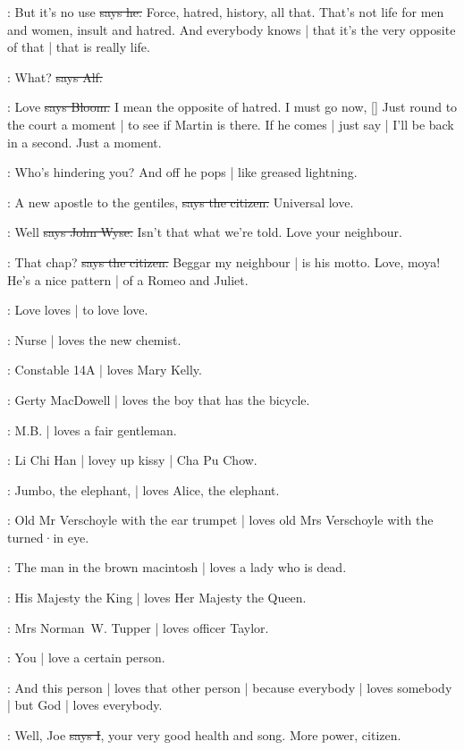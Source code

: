 \Bloom:
But it's no use
\sout{says he.}
Force,
hatred,
history,
all that.
That's not life for men and women,
insult and hatred.
And everybody knows |
that it's the very opposite of that |
that is really life.

\bergan:
What?
\sout{says Alf.}

\Bloom:
Love
\sout{says Bloom.}
I mean the opposite of hatred.
I must go now,
[]
Just round to the court a moment |
to see if Martin is there.
If he comes |
just say |
I'll be back in a second.
Just a moment.

\Nq:
Who's hindering you?
And off he pops |
like greased lightning.


\citizen:
A new apostle to the gentiles,
\sout{says the citizen.}
Universal love.

\johnwyse:
Well
\sout{says John Wyse.}
Isn't that what we're told.
Love your neighbour.

\citizen:
That chap?
\sout{says the citizen.}
Beggar my neighbour |
is his motto.
Love,
moya!
He's a nice pattern |
of a Romeo and Juliet.

:
Love loves |
to love love.

:
Nurse |
loves the new chemist.

:
Constable 14A |
loves Mary Kelly.

:
Gerty MacDowell |
loves the boy that has the bicycle.

:
M.B. |
loves a fair gentleman.

:
Li Chi Han |
lovey up kissy |
Cha Pu Chow.

:
Jumbo, the elephant, |
loves Alice, the elephant.

:
Old Mr Verschoyle with the ear trumpet |
loves old Mrs Verschoyle with the turned·in eye.

:
The man in the brown macintosh |
loves a lady who is dead.

:
His Majesty the King |
loves Her Majesty the Queen.

:
Mrs Norman~W. Tupper |
loves officer Taylor.

:
You |
love a certain person.

:
And this person |
loves that other person |
because everybody |
loves somebody |
but God |
loves everybody.

:
Well,
Joe
\sout{says I},
your very good health and song.
More power,
citizen.

